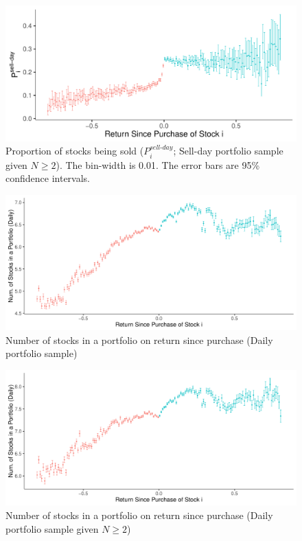 \documentclass[11pt, a4paper]{article}
\begin{document}
\begin{appendices}
\begin{figure}[H]
	\centering
	\includegraphics[width=0.8\columnwidth]{barc_schedule_sell_day_N2_3.pdf}
	\caption{\small Proportion of stocks being sold ($P^{sell\mbox{-}day}_{i}$; Sell-day portfolio sample given $N\geq2$). The bin-width is 0.01. The error bars are 95\% confidence intervals.}
	\label{figure:prop_sell_days_n2}
\end{figure}


\begin{figure}[H]
	\centering
	\includegraphics[width=0.8\columnwidth]{barc_num_stocks_daily_3.pdf}
	\caption{\small Number of stocks in a portfolio on return since purchase (Daily portfolio sample)}
	\label{figure:N_on_return}
\end{figure}

\pagebreak

\begin{figure}[H]
	\centering
	\includegraphics[width=0.8\columnwidth]{barc_num_stocks_daily_N2_3.pdf}
	\caption{\small Number of stocks in a portfolio on return since purchase (Daily portfolio sample given $N\geq2$)}
	\label{figure:N_on_return_n2}
\end{figure}


\end{appendices}
\end{document}

